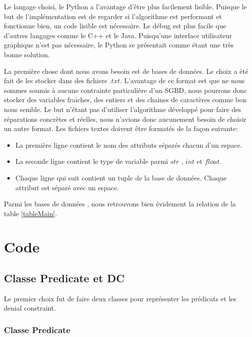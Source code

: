 \documentclass[letterpaper, 12pt]{report}
\theoremstyle{definition}
\begin{document}
Le langage choisi, le Python a l'avantage d'être plus facilement lisible. Puisque le but de l'implémentation est de regarder si l'algorithme est performant et fonctionne bien, un code lisible est nécessaire. Le débug est plus facile que d'autres langages comme le C++ et le Java. Puisqu'une interface utilisateur graphique n'est pas nécessaire, le Python se présentait comme étant une très bonne solution.

La première chose dont nous avons besoin est de bases de données. Le choix a été fait de les stocker dans des fichiers $.txt$. L'avantage de ce format est que ne nous sommes soumis à aucune contrainte particulière d'un SGBD, nous pourrons donc stocker des variables fraiches, des entiers et des chaines de caractères comme bon nous semble. Le but n'étant pas d'utiliser l'algorithme développé pour faire des réparations concrètes et réelles, nous n'avions donc aucunement besoin de choisir un autre format. Les fichiers textes doivent être formatés de la façon suivante:
\begin{itemize}


\item La première ligne contient le nom des attributs séparés chacun d'un espace.
\item La seconde ligne contient le type de variable parmi $str$ , $int$ et $float$.
\item Chaque ligne qui suit contient un tuple de la base de données. Chaque attribut est séparé avec un espace.

\end{itemize}

Parmi les bases de données , nous retrouvons bien évidement la relation de la table \ref{tableMain}.

\section{Code}

\subsection{Classe Predicate et DC}

Le premier choix fut de faire deux classes pour représenter les prédicats et les denial constraint.

\subsubsection{Classe Predicate}
\end{document}

